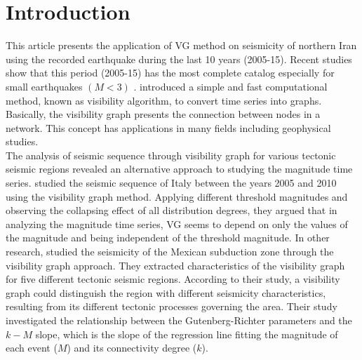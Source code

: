\section{Introduction}
\noindent
This article presents the application of VG method on seismicity of northern Iran using the recorded earthquake during the last 10 years (2005-15). Recent studies show that this period (2005-15) has the most complete catalog especially for small earthquakes $(M < 3)$ \citep[e.g.][]{Khoshnevis2016}.  \citet{Lacasa2008} introduced a simple and fast computational method, known as visibility algorithm, to convert time series into graphs. Basically, the visibility graph presents the connection between nodes in a network. This concept has applications in many fields including geophysical studies\citep[e.g.,][]{Telesca2012_CSF,Long2013,Wang2012}. \\
\noindent
The analysis of seismic sequence through visibility graph for various tectonic seismic regions revealed an alternative approach to studying the magnitude time series.  \citet{Telesca2012} studied the seismic sequence of Italy between the years 2005 and 2010 using the visibility graph method. Applying different threshold magnitudes and observing the collapsing effect of all distribution degrees, they argued that in analyzing the magnitude time series, VG seems to depend on only the values of the magnitude and being independent of the threshold magnitude. 
\noindent
In other research, \citet{Telesca2013} studied the seismicity of the Mexican subduction zone through the visibility graph approach. They extracted characteristics of the visibility graph for five different tectonic seismic regions.  According to their study, a visibility graph could distinguish the region with different seismicity characteristics, resulting from its different tectonic processes governing the area. Their study investigated the relationship between the Gutenberg-Richter parameters and the $k-M$ slope, which is the slope of the regression line fitting the magnitude of each event  ($M$) and its connectivity degree  ($k$). 
\noindent
